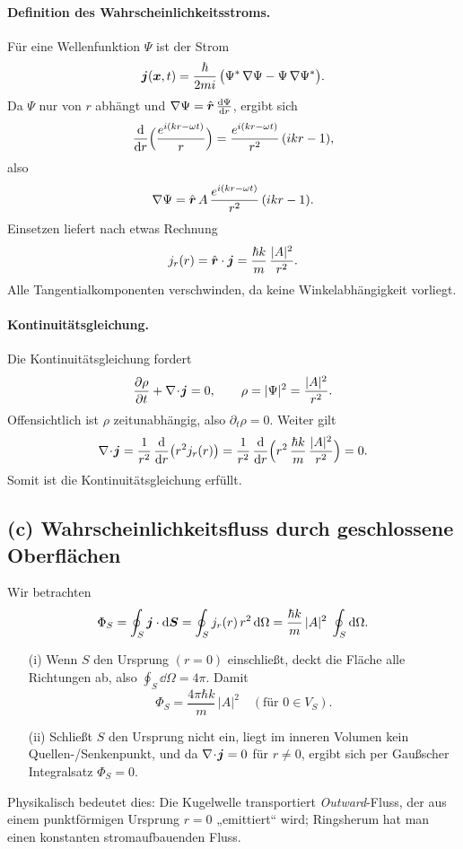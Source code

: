 \documentclass[a4paper,11pt]{article}
\begin{document}
\paragraph{Definition des Wahrscheinlichkeitsstroms.}
Für eine Wellenfunktion \(\Psi\) ist der Strom
\[
\vb*{j}(\vb*{x},t)
= \frac{\hbar}{2mi}\,\bigl(\Psi^*\,\nabla\Psi - \Psi\,\nabla\Psi^*\bigr).
\]
Da \(\Psi\) nur von \(r\) abhängt und \(\nabla \Psi = \hat{\vb*{r}}\,\frac{\dd\Psi}{\dd r}\),
ergibt sich
\[
\frac{\dd}{\dd r}\Bigl(\frac{e^{i(kr-\omega t)}}{r}\Bigr)
= \frac{e^{i(kr-\omega t)}}{r^2}\,(ikr - 1),
\]
also
\[
\nabla\Psi
= \hat{\vb*{r}}\,
A\,\frac{e^{i(kr-\omega t)}}{r^2}\,(ikr - 1).
\]
Einsetzen liefert nach etwas Rechnung
\[
j_r(r)
= \hat{\vb*{r}}\cdot\vb*{j}
= \frac{\hbar k}{m}\,\frac{\lvert A\rvert^2}{r^2}.
\]
Alle Tangentialkomponenten verschwinden, da keine Winkelabhängigkeit vorliegt.

\paragraph{Kontinuitätsgleichung.}
Die Kontinuitätsgleichung fordert
\[
\frac{\partial \rho}{\partial t} + \nabla\!\cdot\!\vb*{j} = 0,
\qquad
\rho = \lvert \Psi\rvert^2 = \frac{\lvert A\rvert^2}{r^2}.
\]
Offensichtlich ist \(\rho\) zeitunabhängig, also \(\partial_t\rho=0\). Weiter gilt
\[
\nabla\!\cdot\!\vb*{j}
= \frac{1}{r^2}\,\frac{\dd}{\dd r}\bigl(r^2 j_r(r)\bigr)
= \frac{1}{r^2}\,\frac{\dd}{\dd r}\Bigl(r^2\,\frac{\hbar k}{m}\,\frac{\lvert A\rvert^2}{r^2}\Bigr)
= 0.
\]
Somit ist die Kontinuitätsgleichung erfüllt.

\subsection*{(c) Wahrscheinlichkeitsfluss durch geschlossene Oberflächen}

Wir betrachten
\[
\Phi_S
= \oint_S \vb*{j}\cdot \dd\vb*{S}
= \oint_S j_r(r)\,r^2\,\dd\Omega
= \frac{\hbar k}{m}\,\lvert A\rvert^2
\;\oint_S \dd\Omega.
\]

\begin{itemize}
  \item[(i)] Wenn \(S\) den Ursprung \((r=0)\) einschließt, deckt die Fläche alle Richtungen ab, also
  \(\displaystyle\oint_S \dd\Omega = 4\pi\). Damit
  \[
    \Phi_S = \frac{4\pi\hbar k}{m}\,\lvert A\rvert^2
    \quad(\text{für }0\in V_S).
  \]
  \item[(ii)] Schließt \(S\) den Ursprung nicht ein, liegt im inneren Volumen kein Quellen-/Senkenpunkt,
  und da \(\nabla\!\cdot\!\vb*{j}=0\) für \(r\neq0\), ergibt sich per Gaußscher Integralsatz
  \(\Phi_S=0\).
\end{itemize}

Physikalisch bedeutet dies: Die Kugelwelle transportiert \emph{Outward}-Fluss, der aus
einem punktförmigen Ursprung \(r=0\) „emittiert“ wird; Ringsherum hat man einen konstanten
stromaufbauenden Fluss.
\end{document}
